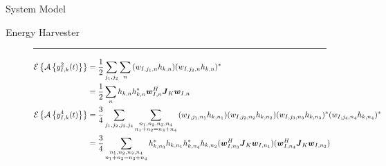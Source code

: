\documentclass{IEEEtran}
\begin{document}
\begin{section}{System Model}
\begin{subsection}{Energy Harvester}
		\begin{figure*}[b]
			\hrule
			\begin{align}
				\mathcal{E}\left\{\mathcal{A}\left\{y_{I,k}^2(t)\right\}\right\}
				 & =\frac{1}{2}\sum_{j_1,j_2}\sum_n{(w_{I,j_1,n}h_{k,n})(w_{I,j_2,n}h_{k,n})^*}\label{eq:E{A{y_{I,k}**2}}}                                                                                                                                                                        \\
				 & =\frac{1}{2}\sum_n{h_{k,n}h_{k,n}^*{\boldsymbol{w}_{I,n}^H}{\boldsymbol{J}_{K}}{\boldsymbol{w}_{I,n}}}                                                                                                                                                                         \\
				\mathcal{E}\left\{\mathcal{A}\left\{y_{I,k}^4(t)\right\}\right\}
				 & =\frac{3}{4}\sum_{j_1,j_2,j_3,j_4}\sum_{\substack{{n_1},{n_2},{n_3},{n_4}\\{n_1}+{n_2}={n_3}+{n_4}}}{(w_{I,{j_1},{n_1}}h_{k,{n_1}})(w_{I,{j_2},{n_2}}h_{k,{n_2}})(w_{I,{j_3},{n_3}}h_{k,{n_3}})^*(w_{I,{j_4},{n_4}}h_{k,{n_4}})^*}                       \\
				 & =\frac{3}{4}\sum_{\substack{{n_1},{n_2},{n_3},{n_4}\\{n_1}+{n_2}={n_3}+{n_4}}}{h_{k,n_3}^*h_{k,n_1}h_{k,n_4}^*h_{k,n_2}(\boldsymbol{w}_{I,n_3}^H\boldsymbol{J}_K\boldsymbol{w}_{I,n_1})(\boldsymbol{w}_{I,n_4}^H\boldsymbol{J}_K\boldsymbol{w}_{I,n_2})} \\

\end{align}
\end{figure*}
\end{subsection}
\end{section}
\end{document}
